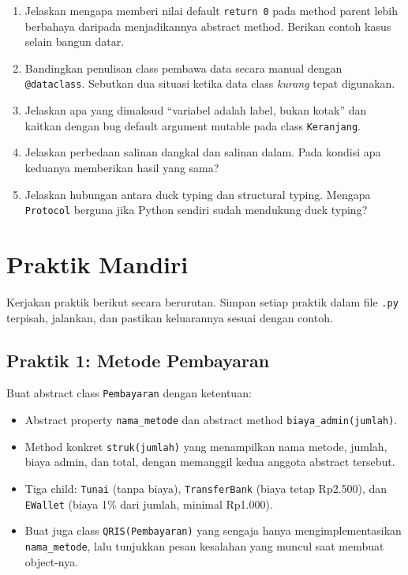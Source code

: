 \begin{enumerate}
  \item Jelaskan mengapa memberi nilai default \texttt{return 0} pada method parent lebih berbahaya daripada menjadikannya abstract method. Berikan contoh kasus selain bangun datar.
  \item Bandingkan penulisan class pembawa data secara manual dengan \texttt{@dataclass}. Sebutkan dua situasi ketika data class \emph{kurang} tepat digunakan.
  \item Jelaskan apa yang dimaksud ``variabel adalah label, bukan kotak'' dan kaitkan dengan bug default argument mutable pada class \texttt{Keranjang}.
  \item Jelaskan perbedaan salinan dangkal dan salinan dalam. Pada kondisi apa keduanya memberikan hasil yang sama?
  \item Jelaskan hubungan antara duck typing dan structural typing. Mengapa \texttt{Protocol} berguna jika Python sendiri sudah mendukung duck typing?
\end{enumerate}

\section{Praktik Mandiri}

Kerjakan praktik berikut secara berurutan. Simpan setiap praktik dalam file \texttt{.py} terpisah, jalankan, dan pastikan keluarannya sesuai dengan contoh.

\subsection{Praktik 1: Metode Pembayaran}

Buat abstract class \texttt{Pembayaran} dengan ketentuan:

\begin{itemize}
  \item Abstract property \texttt{nama\_metode} dan abstract method \texttt{biaya\_admin(jumlah)}.
  \item Method konkret \texttt{struk(jumlah)} yang menampilkan nama metode, jumlah, biaya admin, dan total, dengan memanggil kedua anggota abstract tersebut.
  \item Tiga child: \texttt{Tunai} (tanpa biaya), \texttt{TransferBank} (biaya tetap Rp2.500), dan \texttt{EWallet} (biaya 1\% dari jumlah, minimal Rp1.000).
  \item Buat juga class \texttt{QRIS(Pembayaran)} yang sengaja hanya mengimplementasikan \texttt{nama\_metode}, lalu tunjukkan pesan kesalahan yang muncul saat membuat object-nya.
\end{itemize}

